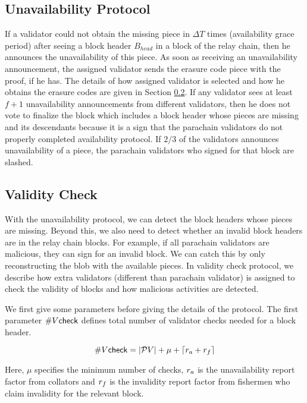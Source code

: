 \subsection{Unavailability Protocol}
\label{sec:unavail}
If a validator could not obtain the missing piece in $\Delta T$ times (availability grace period) after seeing a block header $B_{head}$ in a block of the relay chain, then he announces the unavailability of this piece. As soon as receiving an unavailability announcement, the assigned validator sends the erasure code piece with the proof, if he has. The details of how assigned validator is selected and how he obtains the erasure codes are given in Section \ref{sec:validitycheck}. If any validator sees at least $f+1$ unavailability announcements from different validators, then he does not vote to finalize the block  which includes a block header whose pieces are missing and its descendants because it is a sign that the parachain validators do not properly completed availability protocol. If $2/3$ of the validators announces unavailability of a piece, the parachain validators who signed for that block are slashed. 




\subsection{Validity Check}
\label{sec:validitycheck}
With the unavailability protocol, we can detect the block headers whose pieces are missing. Beyond this, we also need to detect whether an invalid block headers are in the relay chain blocks. For example, if all parachain validators are malicious, they can sign for an invalid block. We can catch this by only reconstructing the blob with the available pieces. In validity check protocol, we describe how extra validators (different than parachain validator) is assigned to check the validity of blocks and how malicious activities are detected.


We first give some parameters before giving the details of the protocol.
The first parameter $\#V\mathsf{check}$ defines total number of validator checks needed for a block header.

$$\#V\mathsf{check} = |\mathcal{P}V| + \mu +\lceil r_{a} + r_{f} \rceil$$

Here, $\mu$ specifies the minimum number of checks, $r_{a}$ is the unavailability report factor from collators and $r_{f}$ is the invalidity report factor from fishermen who claim invalidity for the relevant block. 


